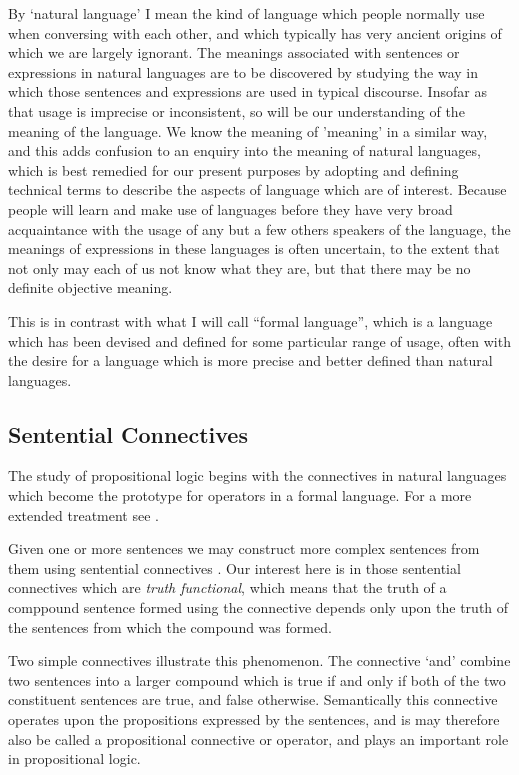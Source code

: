 \documentclass[10pt,titlepage]{book}
\begin{document}
By `natural language' I mean the kind of language which people normally use when conversing with each other, and which typically has very ancient origins of which we are largely ignorant.
The meanings associated with sentences or expressions in natural languages are to be discovered by studying the way in which those sentences and expressions are used in typical discourse.
Insofar as that usage is imprecise or inconsistent, so will be our understanding of the meaning of the language.
We know the meaning of 'meaning' in a similar way, and this adds confusion to an enquiry into the meaning of natural languages, which is best remedied for our present purposes by adopting and defining technical terms to describe the aspects of language which are of interest.
Because people will learn and make use of languages before they have very broad acquaintance with the usage of any but a few others speakers of the language, the meanings of expressions in these languages is often uncertain, to the extent that not only may each of us not know what they are, but that there may be no definite objective meaning.

This is in contrast with what I will call ``formal language'', which is a language which has been devised and defined for some particular range of usage, often with the desire for a language which is more precise and better defined than natural languages.

\subsection{Sentential Connectives}

The study of propositional logic begins with the connectives in natural languages which become the prototype for operators in a formal language.
For a more extended treatment see \cite{sep-connectives-logic}.

Given one or more sentences we may construct more complex sentences from them using sentential connectives .
Our interest here is in those sentential connectives which are \emph{truth functional}, which means that the truth of a comppound sentence formed using the connective depends only upon the truth of the sentences from which the compound was formed.

Two simple connectives illustrate this phenomenon.
The connective `and' combine two sentences into a larger compound which is true if and only if both of the two constituent sentences are true, and false otherwise.
Semantically this connective operates upon the propositions expressed by the sentences, and is may therefore also be called a propositional connective or operator, and plays an important role in propositional logic.
\end{document}
